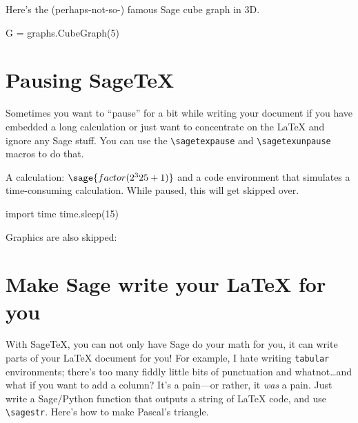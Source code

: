 \documentclass{article}
\begin{document}

Here's the (perhaps-not-so-) famous Sage cube graph in 3D.

\begin{sageblock}
  G = graphs.CubeGraph(5)
\end{sageblock}


\section{Pausing Sage\TeX}
\label{sec:pausing-sagetex}

Sometimes you want to ``pause'' for a bit while writing your document if
you have embedded a long calculation or just want to concentrate on the
\LaTeX{} and ignore any Sage stuff. You can use the \verb|\sagetexpause|
and \verb|\sagetexunpause| macros to do that.

\sagetexpause

A calculation: $\sage{factor(2^325 + 1)}$ and a code environment that
simulates a time-consuming calculation. While paused, this will get
skipped over.
\begin{sageblock}
  import time
  time.sleep(15)
\end{sageblock}

Graphics are also skipped: 

\sagetexunpause

\section{Make Sage write your \LaTeX{} for you}

With \textsf{Sage\TeX}, you can not only have Sage do your math for you,
it can write parts of your \LaTeX{} document for you! For example, I
hate writing \texttt{tabular} environments; there's too many fiddly
little bits of punctuation and whatnot\ldots and what if you want to add
a column? It's a pain---or rather, it \emph{was} a pain. Just write a
Sage/Python function that outputs a string of \LaTeX{} code, and use
\verb|\sagestr|. Here's how to make Pascal's triangle.
\end{document}
